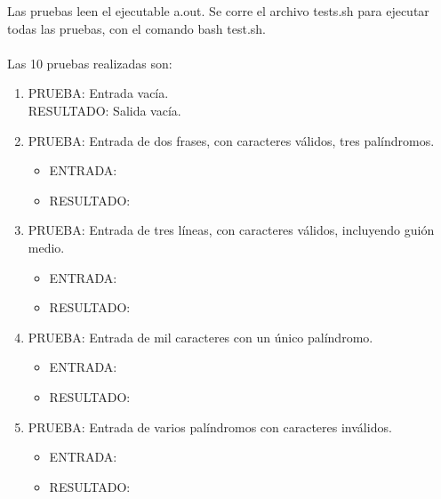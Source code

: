 \documentclass[a4paper,10pt]{article}
\begin{document}
Las pruebas leen el ejecutable a.out. Se corre el archivo tests.sh para ejecutar todas las pruebas, con el comando bash test.sh.\\
\\
Las 10 pruebas realizadas son:\\
\begin{enumerate}[1.]
	\item PRUEBA: Entrada vac\'ia.\\
	RESULTADO: Salida vac\'ia.\\

	\item PRUEBA: Entrada de dos frases, con caracteres v\'alidos, tres pal\'indromos.\\
	\begin{itemize}
		\item ENTRADA:
		
		\item RESULTADO:
		
	\end{itemize}

	\item PRUEBA: Entrada de tres l\'ineas, con caracteres v\'alidos, incluyendo gui\'on medio.\\
	\begin{itemize}
		\item ENTRADA:
		
		\item RESULTADO:
		
	\end{itemize}

	\item PRUEBA: Entrada de mil caracteres con un \'unico pal\'indromo.\\
	\begin{itemize}
		\item ENTRADA:
		
		\item RESULTADO:
		
	\end{itemize}

	\item PRUEBA: Entrada de varios pal\'indromos con caracteres inv\'alidos.\\
	\begin{itemize}
		\item ENTRADA:
		
		\item RESULTADO:
		
	\end{itemize}


\end{enumerate}
\end{document}
